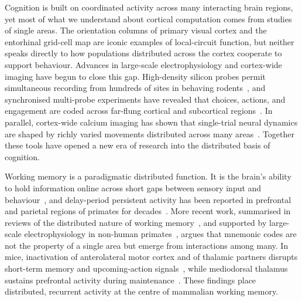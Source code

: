 \documentclass[11pt]{article}
\begin{document}
Cognition is built on coordinated activity across many interacting brain regions, yet most of what we understand about cortical computation comes from studies of single areas. The orientation columns of primary visual cortex and the entorhinal grid-cell map are iconic examples of local-circuit function, but neither speaks directly to how populations distributed across the cortex cooperate to support behaviour. Advances in large-scale electrophysiology and cortex-wide imaging have begun to close this gap. High-density silicon probes permit simultaneous recording from hundreds of sites in behaving rodents~\cite{jun2017neuropixels}, and synchronised multi-probe experiments have revealed that choices, actions, and engagement are coded across far-flung cortical and subcortical regions~\cite{steinmetz2019distributed}. In parallel, cortex-wide calcium imaging has shown that single-trial neural dynamics are shaped by richly varied movements distributed across many areas~\cite{musall2019single,stringer2019spontaneous}. Together these tools have opened a new era of research into the distributed basis of cognition.

Working memory is a paradigmatic distributed function. It is the brain's ability to hold information online across short gaps between sensory input and behaviour~\cite{baddeley2012working}, and delay-period persistent activity has been reported in prefrontal and parietal regions of primates for decades~\cite{funahashi1989mnemonic,goldmanrakic1995cellular}. More recent work, summarised in reviews of the distributed nature of working memory~\cite{christophel2017distributed,leavitt2017sustained}, and supported by large-scale electrophysiology in non-human primates~\cite{dotson2018nonhierarchical}, argues that mnemonic codes are not the property of a single area but emerge from interactions among many. In mice, inactivation of anterolateral motor cortex and of thalamic partners disrupts short-term memory and upcoming-action signals~\cite{guo2017maintenance,inagaki2019discrete,gilad2018behavioral}, while mediodorsal thalamus sustains prefrontal activity during maintenance~\cite{bolkan2017thalamic,schmitt2017thalamic}. These findings place distributed, recurrent activity at the centre of mammalian working memory.
\end{document}
